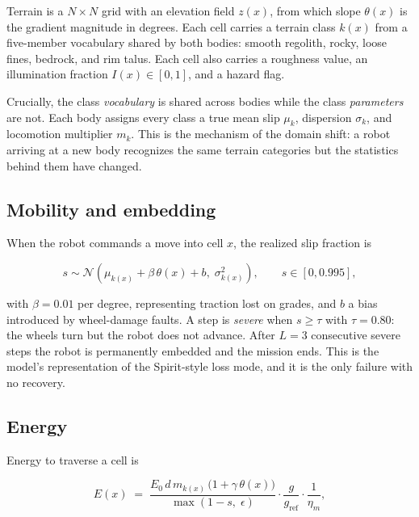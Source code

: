 \documentclass[11pt]{article}
\begin{document}
Terrain is a $N \times N$ grid with an elevation field $z(x)$, from which slope
$\theta(x)$ is the gradient magnitude in degrees. Each cell carries a terrain
class $k(x)$ from a five-member vocabulary shared by both bodies: smooth
regolith, rocky, loose fines, bedrock, and rim talus. Each cell also carries a
roughness value, an illumination fraction $I(x) \in [0,1]$, and a hazard flag.

Crucially, the class \emph{vocabulary} is shared across bodies while the class
\emph{parameters} are not. Each body assigns every class a true mean slip
$\mu_k$, dispersion $\sigma_k$, and locomotion multiplier $m_k$. This is the
mechanism of the domain shift: a robot arriving at a new body recognizes the
same terrain categories but the statistics behind them have changed.

\subsection{Mobility and embedding}

When the robot commands a move into cell $x$, the realized slip fraction is

\begin{equation}
  s \sim \mathcal{N}\!\left(\mu_{k(x)} + \beta\,\theta(x) + b,\; \sigma_{k(x)}^2\right),
  \qquad s \in [0, 0.995],
  \label{eq:slip}
\end{equation}

with $\beta = 0.01$ per degree, representing traction lost on grades, and $b$ a
bias introduced by wheel-damage faults. A step is \emph{severe} when
$s \ge \tau$ with $\tau = 0.80$: the wheels turn but the robot does not
advance. After $L = 3$ consecutive severe steps the robot is permanently
embedded and the mission ends. This is the model's representation of the
Spirit-style loss mode, and it is the only failure with no recovery.

\subsection{Energy}

Energy to traverse a cell is

\begin{equation}
  E(x) \;=\; \frac{E_0 \, d \, m_{k(x)} \,\bigl(1 + \gamma\,\theta(x)\bigr)}
                  {\max(1 - s,\; \epsilon)}
             \cdot \frac{g}{g_{\mathrm{ref}}} \cdot \frac{1}{\eta_m},
  \label{eq:energy}
\end{equation}
\end{document}
